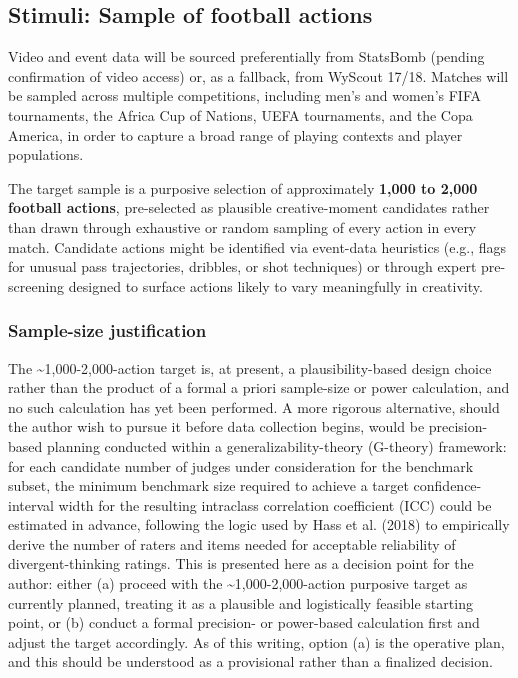\documentclass[
  12pt,
]{article}
\begin{document}
\subsection{Stimuli: Sample of football
actions}\label{stimuli-sample-of-football-actions}

Video and event data will be sourced preferentially from StatsBomb
(pending confirmation of video access) or, as a fallback, from WyScout
17/18. Matches will be sampled across multiple competitions, including
men's and women's FIFA tournaments, the Africa Cup of Nations, UEFA
tournaments, and the Copa America, in order to capture a broad range of
playing contexts and player populations.

The target sample is a purposive selection of approximately
\textbf{1,000 to 2,000 football actions}, pre-selected as plausible
creative-moment candidates rather than drawn through exhaustive or
random sampling of every action in every match. Candidate actions might
be identified via event-data heuristics (e.g., flags for unusual pass
trajectories, dribbles, or shot techniques) or through expert
pre-screening designed to surface actions likely to vary meaningfully in
creativity.

\subsubsection{Sample-size
justification}\label{sample-size-justification}

The \textasciitilde1,000-2,000-action target is, at present, a
plausibility-based design choice rather than the product of a formal a
priori sample-size or power calculation, and no such calculation has yet
been performed. A more rigorous alternative, should the author wish to
pursue it before data collection begins, would be precision-based
planning conducted within a generalizability-theory (G-theory)
framework: for each candidate number of judges under consideration for
the benchmark subset, the minimum benchmark size required to achieve a
target confidence-interval width for the resulting intraclass
correlation coefficient (ICC) could be estimated in advance, following
the logic used by Hass et al. (2018) to empirically derive the number of
raters and items needed for acceptable reliability of divergent-thinking
ratings. This is presented here as a decision point for the author:
either (a) proceed with the \textasciitilde1,000-2,000-action purposive
target as currently planned, treating it as a plausible and logistically
feasible starting point, or (b) conduct a formal precision- or
power-based calculation first and adjust the target accordingly. As of
this writing, option (a) is the operative plan, and this should be
understood as a provisional rather than a finalized decision.
\end{document}
